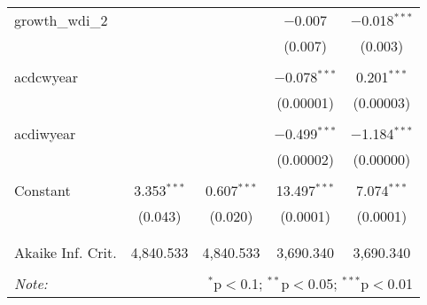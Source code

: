 \begin{table}[!htbp]
\begin{tabular}{@{\extracolsep{5pt}}lcccc}
 growth\_wdi\_2 &  &  & $-$0.007 & $-$0.018$^{***}$ \\ 
  &  &  & (0.007) & (0.003) \\ 
  & & & & \\ 
 acdcwyear &  &  & $-$0.078$^{***}$ & 0.201$^{***}$ \\ 
  &  &  & (0.00001) & (0.00003) \\ 
  & & & & \\ 
 acdiwyear &  &  & $-$0.499$^{***}$ & $-$1.184$^{***}$ \\ 
  &  &  & (0.00002) & (0.00000) \\ 
  & & & & \\ 
 Constant & 3.353$^{***}$ & 0.607$^{***}$ & 13.497$^{***}$ & 7.074$^{***}$ \\ 
  & (0.043) & (0.020) & (0.0001) & (0.0001) \\ 
  & & & & \\ 
\hline \\[-1.8ex] 
Akaike Inf. Crit. & 4,840.533 & 4,840.533 & 3,690.340 & 3,690.340 \\ 
\hline 
\hline \\[-1.8ex] 
\textit{Note:}  & \multicolumn{4}{r}{$^{*}$p$<$0.1; $^{**}$p$<$0.05; $^{***}$p$<$0.01} \\ 
\end{tabular} 
\end{table} 
